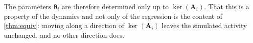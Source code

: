 \documentclass{article}
\newcommand{\comment}[1]{\textcolor{orange}{[#1]}}
\def\vrest{V^{\mathrm{rest}}}
\begin{document}



{\color{revised}The parameters $\boldsymbol\theta_i$ are therefore determined only up to $\ker(\mathbf{A}_i)$. That this is a property of the dynamics and not only of the regression is the content of \cref{thm:equiv}: moving along a direction of $\ker(\mathbf{A}_i)$ leaves the simulated activity unchanged, and no other direction does.}
\end{document}
